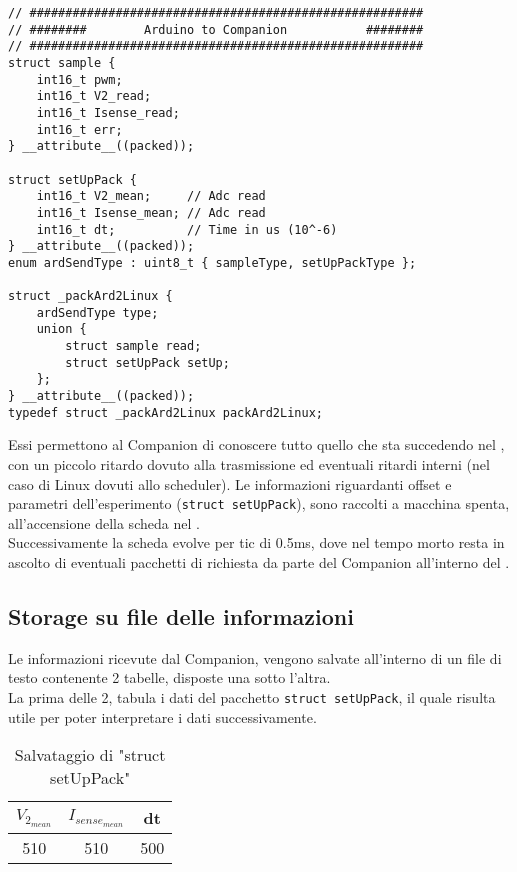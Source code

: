 \begin{lstlisting}[style=cppStyle,caption={Pacchetti \microControllore $\Rightarrow$ Companion },label=lst:Ard2CompanionPack] 
// #######################################################
// ########        Arduino to Companion           ########
// #######################################################
struct sample {
	int16_t pwm;
	int16_t V2_read;
	int16_t Isense_read;
	int16_t err;
} __attribute__((packed));

struct setUpPack {
	int16_t V2_mean;     // Adc read
	int16_t Isense_mean; // Adc read
	int16_t dt;          // Time in us (10^-6)
} __attribute__((packed));
enum ardSendType : uint8_t { sampleType, setUpPackType };

struct _packArd2Linux {
	ardSendType type;
	union {
		struct sample read;
		struct setUpPack setUp;
	};
} __attribute__((packed));
typedef struct _packArd2Linux packArd2Linux;
\end{lstlisting}
\noindent
Essi permettono al Companion di conoscere tutto quello che sta succedendo nel \microC, con un piccolo ritardo dovuto alla trasmissione ed eventuali ritardi interni (nel caso di Linux dovuti allo scheduler).
Le informazioni riguardanti offset e parametri dell'esperimento (\verb|struct setUpPack|), sono raccolti a macchina spenta, all'accensione della scheda nel .\\
Successivamente la scheda evolve per tic di 0.5ms, dove nel tempo morto resta in ascolto di eventuali pacchetti di richiesta da parte del Companion all'interno del .\\

\subsection{Storage su file delle informazioni}\label{subsec:experimentStorage}
Le informazioni ricevute dal Companion, vengono salvate all'interno di un file di testo contenente 2 tabelle, disposte una sotto l'altra.\\
La prima delle 2, tabula i dati del pacchetto \verb|struct setUpPack|, il quale risulta utile per poter interpretare i dati successivamente.
\begin{table}[h]
	\centering
	\begin{tabular}[t]{|c|c|c|}
		\hline
		$ V_{2_{mean}} $ & $ I_{sense_{mean}}$ & dt  \\
		\hline
		510              & 510                 & 500 \\
		\hline
	\end{tabular}
	\caption[Salvataggio di "struct setUpPack"]{Salvataggio di "struct setUpPack"}
\end{table}

